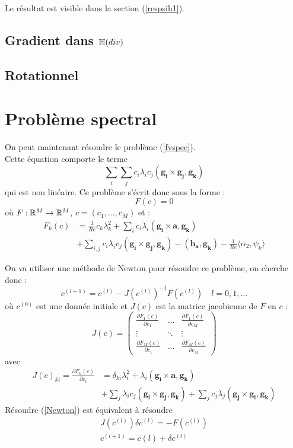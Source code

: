 Le résultat est visible dans la section (\ref{respsih1}).

\subsection{Gradient dans ${\mathbb{H}}(div)$}

\subsection{Rotationnel}

\section{Problème spectral}

On peut maintenant résoudre le problème (\ref{fvspec}).\\
Cette équation comporte le terme
\[
\sum_i\sum_j c_i\lambda_i c_j(\mathbf{g_i}\times \mathbf{g_j}, \mathbf{g_k})
\]
qui est non linéaire. Ce problème s'écrit donc sous la forme :
\[
F(c) = 0
\]
où $F:{\mathbb{R}}^M\rightarrow{\mathbb{R}}^M$, $c=(c_1,\ldots, c_M)$ et :
\begin{align*}
F_k(c) &= \frac{1}{Re} c_k\lambda_k^2 + \sum_i c_i\lambda_i(\mathbf{g_i}\times \mathbf{a}, \mathbf{g_k})\\
&+ \sum_{i,j} c_i\lambda_i c_j (\mathbf{g_i}\times \mathbf{g_j}, \mathbf{g_k}) - (\mathbf{h_a},\mathbf{g_k}) - \frac{1}{Re}\langle \alpha_2, \psi_k \rangle
\end{align*}

On va utiliser une méthode de Newton pour résoudre ce problème, on cherche donc :
\begin{equation}
\label{Newton}
c^{(l+1)} = c^{(l)} - J(c^{(l)})^{-1}F(c^{(l)})\quad l=0,1,\ldots
\end{equation}
où $c^{(0)}$ est une donnée initiale et $J(c)$ est la matrice jacobienne de $F$ en $c$ :
\[
J(c)=
\begin{pmatrix}
\frac{\partial F_1(c)}{\partial c_1} & \ldots & \frac{\partial F_1(c)}{\partial c_M}\\
\vdots & \ddots & \vdots\\
\frac{\partial F_M(c)}{\partial c_1} & \ldots & \frac{\partial F_M(c)}{\partial c_M}
\end{pmatrix}
\]
avec 
\begin{align*}
J(c)_{ki} = \frac{\partial F_k(c)}{\partial c_i} &= \delta_{ki}\lambda_i^2 + \lambda_i(\mathbf{g_i}\times \mathbf{a},\mathbf{g_k})\\
&+ \sum_j\lambda_i c_j (\mathbf{g_i}\times\mathbf{g_j},\mathbf{g_k}) + \sum_j c_j\lambda_j (\mathbf{g_j}\times\mathbf{g_i},\mathbf{g_k})
\end{align*}
Résoudre (\ref{Newton}) est équivalent à résoudre 
\begin{equation}
\label{INewton}
\begin{aligned}
J(c^{(l)})\delta c^{(l)} = -F(c^{(l)})\\
c^{(l+1)}=c{(l)}+\delta c^{(l)}
\end{aligned}
\end{equation}

